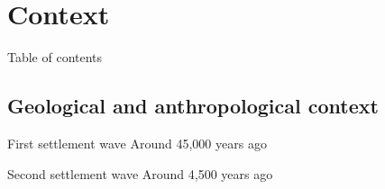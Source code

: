 \documentclass[10pt, aspectratio=43]{beamer}
\begin{document}
\section{Context}
\begin{frame}{}{Table of contents}
\tableofcontents[currentsection, subsectionstyle=show/show/hide]
\end{frame}

\subsection{Geological and anthropological context}

\begin{frame}{}{}
\end{frame}

\addtocounter{framenumber}{-1}
\begin{frame}{}{First settlement wave Around 45,000 years ago}
\end{frame}

\addtocounter{framenumber}{-1}
\begin{frame}{}{Second settlement wave Around 4,500 years ago}
\end{frame}
\end{document}
